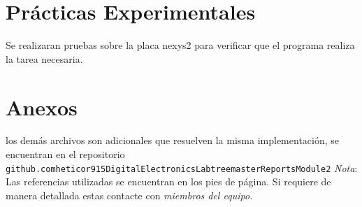 \documentclass[paper=a4, fontsize=12pt]{article} 		%
\numberwithin{equation}{section}						%
\numberwithin{table}{section} 							%
\begin{document}
\section{Prácticas Experimentales}
Se realizaran pruebas sobre la placa nexys2 para verificar que el programa realiza la tarea necesaria.

\section{Anexos}
los demás archivos son adicionales que resuelven la misma implementación, se encuentran en el repositorio \texttt{github.com\/heticor915\/DigitalElectronicsLab\/tree\/master\/Reports\/Module2\/}
\textit{Nota}: Las referencias utilizadas se encuentran en los pies de página. Si requiere de manera detallada estas contacte con \emph{miembros del equipo.}
\end{document}

